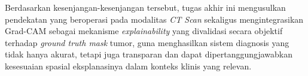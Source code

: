 Berdasarkan kesenjangan-kesenjangan tersebut, tugas akhir ini mengusulkan pendekatan yang beroperasi pada modalitas \textit{CT Scan} sekaligus mengintegrasikan Grad-CAM sebagai mekanisme \textit{explainability} yang divalidasi secara objektif terhadap \textit{ground truth mask} tumor, guna menghasilkan sistem diagnosis yang tidak hanya akurat, tetapi juga transparan dan dapat dipertanggungjawabkan kesesuaian spasial eksplanasinya dalam konteks klinis yang relevan.

%
%
%
